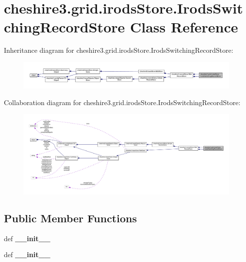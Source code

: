 \hypertarget{classcheshire3_1_1grid_1_1irods_store_1_1_irods_switching_record_store}{\section{cheshire3.\-grid.\-irods\-Store.\-Irods\-Switching\-Record\-Store Class Reference}
\label{classcheshire3_1_1grid_1_1irods_store_1_1_irods_switching_record_store}
}


Inheritance diagram for cheshire3.\-grid.\-irods\-Store.\-Irods\-Switching\-Record\-Store\-:
\nopagebreak
\begin{figure}[H]
\begin{center}
\leavevmode
\includegraphics[width=350pt]{classcheshire3_1_1grid_1_1irods_store_1_1_irods_switching_record_store__inherit__graph}
\end{center}
\end{figure}


Collaboration diagram for cheshire3.\-grid.\-irods\-Store.\-Irods\-Switching\-Record\-Store\-:
\nopagebreak
\begin{figure}[H]
\begin{center}
\leavevmode
\includegraphics[width=350pt]{classcheshire3_1_1grid_1_1irods_store_1_1_irods_switching_record_store__coll__graph}
\end{center}
\end{figure}
\subsection*{Public Member Functions}
\begin{DoxyCompactItemize}
\item 
\hypertarget{classcheshire3_1_1grid_1_1irods_store_1_1_irods_switching_record_store_aa6a65fbb6cedb7e54c3e637f88526a04}{def {\bfseries \-\_\-\-\_\-init\-\_\-\-\_\-}}\label{classcheshire3_1_1grid_1_1irods_store_1_1_irods_switching_record_store_aa6a65fbb6cedb7e54c3e637f88526a04}

\item 
\hypertarget{classcheshire3_1_1grid_1_1irods_store_1_1_irods_switching_record_store_aa6a65fbb6cedb7e54c3e637f88526a04}{def {\bfseries \-\_\-\-\_\-init\-\_\-\-\_\-}}\label{classcheshire3_1_1grid_1_1irods_store_1_1_irods_switching_record_store_aa6a65fbb6cedb7e54c3e637f88526a04}

\end{DoxyCompactItemize}
